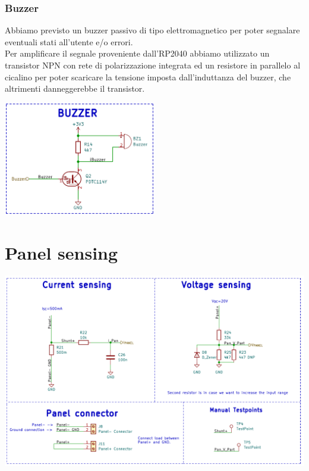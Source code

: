 \hypertarget{buzzer}{%
\subsubsection{\texorpdfstring{\hfill\break
\hfill\break
Buzzer}{  Buzzer}}\label{buzzer}}

Abbiamo previsto un buzzer passivo di tipo elettromagnetico per poter
segnalare eventuali stati all'utente e/o errori.\\
Per amplificare il segnale proveniente dall'RP2040 abbiamo utilizzato un transistor NPN con
rete di polarizzazione integrata ed un resistore in parallelo al
cicalino per poter scaricare la tensione imposta dall'induttanza del
buzzer, che altrimenti danneggerebbe il transistor.

\begin{center}
\includegraphics[width=0.5\textwidth]{figures/image38.png}
\captionsetup{type=figure}
\end{center}

\hypertarget{panel-sensing}{%
\section{\texorpdfstring{Panel sensing}{ Panel sensing}}\label{panel-sensing}}

\begin{center}
\includegraphics[scale=0.5]{figures/image24.png}
\captionsetup{type=figure}
\end{center}

